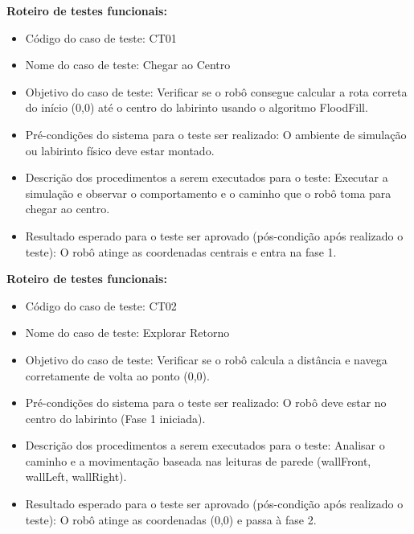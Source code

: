 \item \textbf{ Roteiro de testes funcionais:}
\begin{itemize}
    \item Código do caso de teste: CT01
    \item Nome do caso de teste: Chegar ao Centro
    \item Objetivo do caso de teste: Verificar se o robô consegue calcular a rota correta do início (0,0) até o centro do labirinto usando o algoritmo FloodFill.
    \item Pré-condições do sistema para o teste ser realizado: O ambiente de simulação ou labirinto físico deve estar montado.
    \item Descrição dos procedimentos a serem executados para o teste: Executar a simulação e observar o comportamento e o caminho que o robô toma para chegar ao centro.
    \item Resultado esperado para o teste ser aprovado (pós-condição após realizado o teste): O robô atinge as coordenadas centrais e entra na fase 1.
\end{itemize}

\item \textbf{ Roteiro de testes funcionais:}
\begin{itemize}
    \item Código do caso de teste: CT02
    \item Nome do caso de teste: Explorar Retorno
    \item Objetivo do caso de teste: Verificar se o robô calcula a distância e navega corretamente de volta ao ponto (0,0).
    \item Pré-condições do sistema para o teste ser realizado: O robô deve estar no centro do labirinto (Fase 1 iniciada).
    \item Descrição dos procedimentos a serem executados para o teste: Analisar o caminho e a movimentação baseada nas leituras de parede (wallFront, wallLeft, wallRight).
    \item Resultado esperado para o teste ser aprovado (pós-condição após realizado o teste): O robô atinge as coordenadas (0,0) e passa à fase 2.
\end{itemize}
